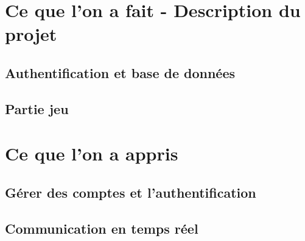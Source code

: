 \documentclass[11pt,a4paper]{article}
\begin{document}
    \section{Ce que l'on a fait - Description du projet}
        \subsection{Authentification et base de données}
        \subsection{Partie jeu}
    \section{Ce que l'on a appris}
        \subsection{Gérer des comptes et l'authentification}
        \subsection{Communication en temps réel}
\end{document}
